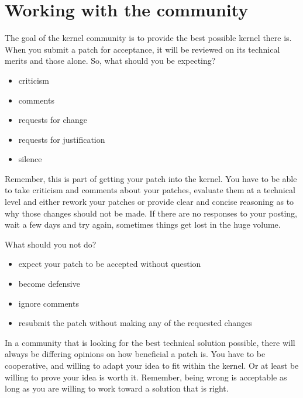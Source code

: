 \documentclass[a4paper,8pt,english]{sphinxmanual}
\begin{document}
\section{Working with the community}
\label{process/howto:working-with-the-community}
The goal of the kernel community is to provide the best possible kernel
there is.  When you submit a patch for acceptance, it will be reviewed
on its technical merits and those alone.  So, what should you be
expecting?
\begin{itemize}
\item {} 
criticism

\item {} 
comments

\item {} 
requests for change

\item {} 
requests for justification

\item {} 
silence

\end{itemize}

Remember, this is part of getting your patch into the kernel.  You have
to be able to take criticism and comments about your patches, evaluate
them at a technical level and either rework your patches or provide
clear and concise reasoning as to why those changes should not be made.
If there are no responses to your posting, wait a few days and try
again, sometimes things get lost in the huge volume.

What should you not do?
\begin{itemize}
\item {} 
expect your patch to be accepted without question

\item {} 
become defensive

\item {} 
ignore comments

\item {} 
resubmit the patch without making any of the requested changes

\end{itemize}

In a community that is looking for the best technical solution possible,
there will always be differing opinions on how beneficial a patch is.
You have to be cooperative, and willing to adapt your idea to fit within
the kernel.  Or at least be willing to prove your idea is worth it.
Remember, being wrong is acceptable as long as you are willing to work
toward a solution that is right.
\end{document}
